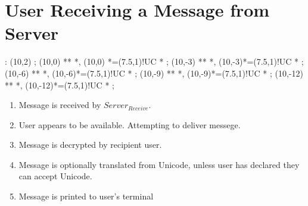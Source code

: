 \documentclass[a4paper,12pt]{article}
\begin{document}
\section{User Receiving a Message from Server}

\xy<1cm,0cm>:
(10,2) ; (10,0) **\dir{=} *\dir{>},
(10,0) *=(7.5,1)!UC *\frm{-} ;
(10,-3) **\dir{-} *\dir{>},
(10,-3)*=(7.5,1)!UC *\frm{-} ; 
(10,-6) **\dir{-} *\dir{>},
(10,-6)*=(7.5,1)!UC *\frm{-} ; 
(10,-9) **\dir{-} *\dir{>},
(10,-9)*=(7.5,1)!UC *\frm{=} ; 
(10,-12) **\dir{-} *\dir{>},
(10,-12)*=(7.5,1)!UC *\frm{-} ; 
\endxy

\begin{enumerate}

\item Message is received by $Server_{Receive}$.

\item User appears to be available. Attempting to deliver messege.

\item Message is decrypted by recipient user. 

\item Message is optionally translated from Unicode, unless user has
declared they can accept Unicode. 

\item Message is printed to user's terminal

\end{enumerate}
\end{document}
